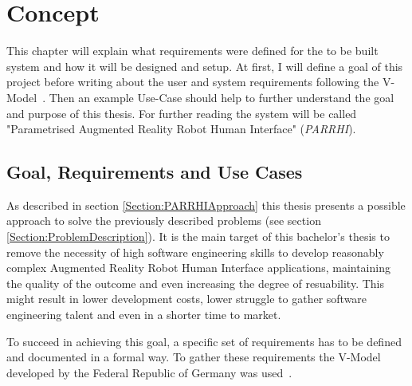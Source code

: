\chapter{Concept}\label{Chap:Concept}

This chapter will explain what requirements were defined for the to be built system and how it will be designed and setup. At first, I will define a goal of this project before writing about the user and system requirements following the V-Model~\cite{vmodell}. Then an example Use-Case should help to further understand the goal and purpose of this thesis.  For further reading the system will be called "Parametrised Augmented Reality Robot Human Interface" (\textit{PARRHI}).

\section{Goal, Requirements and Use Cases}
As described in section \ref{Section:PARRHIApproach} this thesis presents a possible approach to solve the previously described problems (see section \ref{Section:ProblemDescription}). It is the main target of this bachelor's thesis to remove the necessity of high software engineering skills to develop reasonably complex Augmented Reality Robot Human Interface applications, maintaining the quality of the outcome and even increasing the degree of resuability. This might result in lower development costs, lower struggle to gather software engineering talent and even in a shorter time to market.

To succeed in achieving this goal, a specific set of requirements has to be defined and documented in a formal way. To gather these requirements the V-Model developed by the Federal Republic of Germany was used~\cite{vmodell}. 

